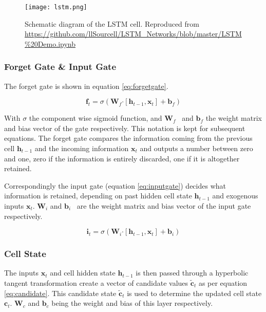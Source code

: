 \begin{figure}
	\noindent\texttt{[image: lstm.png]}
	\caption{Schematic diagram of the LSTM cell. Reproduced 
	from \url{https://github.com/llSourcell/LSTM_Networks/blob/master/LSTM\%20Demo.ipynb}}
	\label{fig:lstmcell}
\end{figure}

\subsubsection*{Forget Gate \& Input Gate}

The forget gate is shown in equation \ref{eq:forgetgate}. 

\begin{equation}\label{eq:forgetgate}
 \mathbf{f}_{t} = \sigma  \left( \mathbf{W}_f \boldsymbol{\cdot}  \left[ \mathbf{h}_{t-1}, \mathbf{x}_t \right] + 
 \mathbf{b}_f \right)
\end{equation}

\vspace{\baselineskip}

With  \(  \sigma  \)  the component wise sigmoid function, and  \( \mathbf{W}_{f} \) \  and  
\( \mathbf{b}_{f} \) the weight matrix and bias vector of the gate respectively. This notation is 
kept for subsequent equations. The forget gate compares the information coming from the previous 
cell  \( \mathbf{h}_{t-1} \) and the incoming information  \( \mathbf{x}_{t} \)  and outputs a number 
between zero and one, zero if the information is entirely discarded, one if it is altogether retained.

Correspondingly the input gate (equation \ref{eq:inputgate}) decides what information is retained, depending 
on past hidden cell state $\mathbf{h}_{t-1}$ and exogenous inputs $\mathbf{x}_t$. \( \mathbf{W}_{i} \)  and  
\( \mathbf{b}_{i} \) \ are the weight matrix and bias vector of the input gate respectively.

\begin{equation}\label{eq:inputgate}
 \mathbf{i}_{t} = \sigma  \left(\mathbf{W}_{i} \boldsymbol{\cdot} \left[ \mathbf{h}_{t-1}, \mathbf{x}_{t} \right] + 
 \mathbf{b}_{i} \right)
\end{equation}

\subsubsection*{Cell State}

The inputs $\mathbf{x}_t$ and cell hidden state $\mathbf{h}_{t-1}$ is then passed through a hyperbolic tangent 
transformation create a vector of candidate values \(  \tilde{\mathbf{c}}_{t} \) as per equation \ref{eq:candidate}. 
This candidate state $\tilde{\mathbf{c}}_{t}$ is used to determine the updated cell state $\mathbf{c}_{t}$. 
\( \mathbf{W}_{c} \)  and  \( \mathbf{b}_{c} \)  being the weight and bias of this layer respectively. 
 

